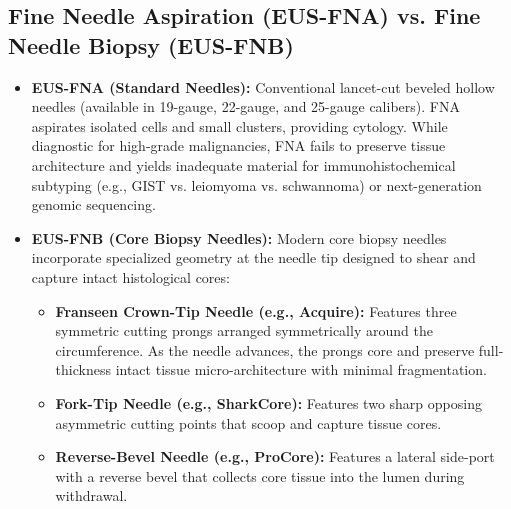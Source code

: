 \documentclass[11pt,a4paper]{article}
\begin{document}
\subsection{Fine Needle Aspiration (EUS-FNA) vs. Fine Needle Biopsy (EUS-FNB)}
\begin{itemize}[leftmargin=2em]
    \item \textbf{EUS-FNA (Standard Needles):} Conventional lancet-cut beveled hollow needles (available in 19-gauge, 22-gauge, and 25-gauge calibers). FNA aspirates isolated cells and small clusters, providing cytology. While diagnostic for high-grade malignancies, FNA fails to preserve tissue architecture and yields inadequate material for immunohistochemical subtyping (e.g., GIST vs. leiomyoma vs. schwannoma) or next-generation genomic sequencing.
    \item \textbf{EUS-FNB (Core Biopsy Needles):} Modern core biopsy needles incorporate specialized geometry at the needle tip designed to shear and capture intact histological cores:
    \begin{itemize}
        \item \textbf{Franseen Crown-Tip Needle (e.g., Acquire):} Features three symmetric cutting prongs arranged symmetrically around the circumference. As the needle advances, the prongs core and preserve full-thickness intact tissue micro-architecture with minimal fragmentation.
        \item \textbf{Fork-Tip Needle (e.g., SharkCore):} Features two sharp opposing asymmetric cutting points that scoop and capture tissue cores.
        \item \textbf{Reverse-Bevel Needle (e.g., ProCore):} Features a lateral side-port with a reverse bevel that collects core tissue into the lumen during withdrawal.
    \end{itemize}
\end{itemize}
\end{document}

